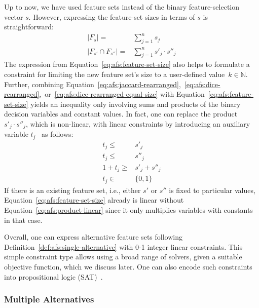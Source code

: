 \documentclass{article}
\theoremstyle{definition}
\begin{document}
Up to now, we have used feature sets instead of the binary feature-selection vector $s$.
However, expressing the feature-set sizes in terms of $s$ is straightforward:
%
\begin{equation}
	\begin{aligned}
		|F_s| =& \sum_{j=1}^n s_j \\
		|F_{s'} \cap F_{s''}| =& \sum_{j=1}^n s'_j \cdot s''_j
	\end{aligned}
	\label{eq:afs:feature-set-size}
\end{equation}
%
The expression from Equation~\ref{eq:afs:feature-set-size} also helps to formulate a constraint for limiting the new feature set's size to a user-defined value~$k \in \mathbb{N}$.
Further, combining Equation~\ref{eq:afs:jaccard-rearranged},~\ref{eq:afs:dice-rearranged},~or~\ref{eq:afs:dice-rearranged-equal-size} with Equation~\ref{eq:afs:feature-set-size} yields an inequality only involving sums and products of the binary decision variables and constant values.
In fact, one can replace the product $s'_j \cdot s''_j$, which is non-linear, with linear constraints by introducing an auxiliary variable $t_j$~\cite{mosek2022modeling} as follows:
%
\begin{equation}
	\begin{aligned}
		t_j \leq& s'_j \\
		t_j \leq& s''_j \\
		1 + t_j \geq& s'_j + s''_j \\
		t_j \in& \{0,1\}
	\end{aligned}
	\label{eq:afs:product-linear}
\end{equation}
%
If there is an existing feature set, i.e., either $s'$ or $s''$ is fixed to particular values, Equation~\ref{eq:afs:feature-set-size} already is linear without Equation~\ref{eq:afs:product-linear} since it only multiplies variables with constants in that case.

Overall, one can express alternative feature sets following Definition~\ref{def:afs:single-alternative} with 0-1 integer linear constraints.
This simple constraint type allows using a broad range of solvers, given a suitable objective function, which we discuss later.
One can also encode such constraints into propositional logic (\textsc{SAT})~\cite{ulrich2022selecting}.

\subsubsection{Multiple Alternatives}
\label{sec:afs:approach:constraints:multiple}
\end{document}
